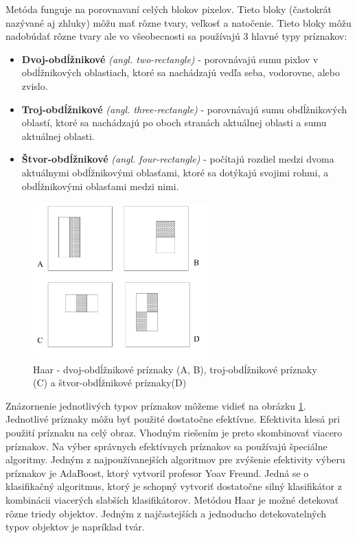 \documentclass[slovak,master,dept460,male,cpp,cpdeclaration]{diploma}
\begin{document}
 Metóda funguje na porovnavaní celých blokov pixelov. Tieto bloky (častokrát nazývané aj zhluky) môžu mať rôzne tvary, veľkosť a natočenie. Tieto bloky môžu nadobúdať rôzne tvary ale vo všeobecnosti sa používajú 3 hlavné typy príznakov:
\begin{itemize}
  \item \textbf{Dvoj-obdĺžnikové} \textit{(angl. two-rectangle)} - porovnávajú sumu pixlov v obdĺžnikových oblastiach, ktoré sa nachádzajú vedľa seba, vodorovne, alebo zvislo.
  \item \textbf{Troj-obdĺžnikové} \textit{(angl. three-rectangle)} - porovnávajú sumu obdĺžnikových oblastí, ktoré sa nachádzajú po oboch stranách aktuálnej oblasti a sumu aktuálnej oblasti.
  \item \textbf{Štvor-obdĺžnikové} \textit{(angl. four-rectangle)} - počítajú rozdiel medzi dvoma aktuálnymi obdĺžnikovými oblasťami, ktoré sa dotýkajú svojimi rohmi, a obdĺžnikovými oblasťami medzi nimi.
  
 \end{itemize}
   \begin{figure}[H]
	\centering
	\includegraphics[width=0.6\textwidth]{Figures/haar1.png}
	\caption{Haar - dvoj-obdĺžnikové príznaky (A, B), troj-obdĺžnikové príznaky (C) a štvor-obdĺžnikové príznaky(D)\cite{viola2001robust}}
	\label{fig:Haar1}
\end{figure}
  Znázornenie jednotlivých typov príznakov môžeme vidieť na obrázku \ref{fig:Haar1}. Jednotlivé príznaky môžu byť použité dostatočne efektívne. Efektivita klesá pri použití príznaku na celý obraz. Vhodným riešením je preto skombinovať viacero príznakov. Na výber  správnych efektívnych príznakov sa používajú špeciálne algoritmy. Jedným z najpoužívanejších algoritmov  pre zvýšenie efektivity výberu príznakov je AdaBoost\cite{freund1995desicion}, ktorý vytvoril profesor Yoav Freund. Jedná se o klasifikačný algoritmus, ktorý je schopný vytvoriť dostatočne silný klasifikátor z kombinácii viacerých slabších klasifikátorov.  Metódou Haar je možné detekovať rôzne triedy objektov.  Jedným z najčastejších a jednoducho detekovatelných  typov objektov je napríklad tvár.
\end{document}
